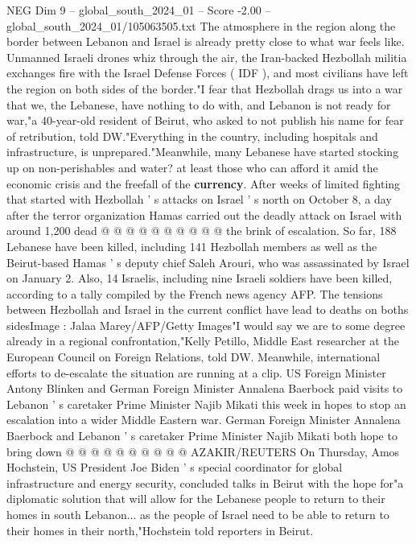 \begin{textsample}{NEG Dim 9 – global\_south\_2024\_01 – Score -2.00 – global\_south\_2024\_01/105063505.txt}  \label{ex:f9_neg_387}
The atmosphere in the region along the border between Lebanon and Israel is already pretty close to what war feels like.
Unmanned Israeli drones whiz through the air, the Iran-backed Hezbollah militia exchanges fire with the Israel Defense Forces ( IDF ), and most civilians have left the region on both sides of the border."I fear that Hezbollah drags us into a war that we, the Lebanese, have nothing to do with, and Lebanon is not ready for war,"a 40-year-old resident of Beirut, who asked to not publish his name for fear of retribution, told DW."Everything in the country, including hospitals and infrastructure, is unprepared."Meanwhile, many Lebanese have started stocking up on non-perishables and water? at least those who can afford it amid the economic crisis and the freefall of the \textbf{currency}.
After weeks of limited fighting that started with Hezbollah ' s attacks on Israel ' s north on October 8, a day after the terror organization Hamas carried out the deadly attack on Israel with around 1,200 dead @ @ @ @ @ @ @ @ @ @ the brink of escalation.
So far, 188 Lebanese have been killed, including 141 Hezbollah members as well as the Beirut-based Hamas ' s deputy chief Saleh Arouri, who was assassinated by Israel on January 2.
Also, 14 Israelis, including nine Israeli soldiers have been killed, according to a tally compiled by the French news agency AFP.
The tensions between Hezbollah and Israel in the current conflict have lead to deaths on boths sidesImage : Jalaa Marey/AFP/Getty Images"I would say we are to some degree already in a regional confrontation,"Kelly Petillo, Middle East researcher at the European Council on Foreign Relations, told DW.
Meanwhile, international efforts to de-escalate the situation are running at a clip.
US Foreign Minister Antony Blinken and German Foreign Minister Annalena Baerbock paid visits to Lebanon ' s caretaker Prime Minister Najib Mikati this week in hopes to stop an escalation into a wider Middle Eastern war.
German Foreign Minister Annalena Baerbock and Lebanon ' s caretaker Prime Minister Najib Mikati both hope to bring down @ @ @ @ @ @ @ @ @ @ AZAKIR/REUTERS On Thursday, Amos Hochstein, US President Joe Biden ' s special coordinator for global infrastructure and energy security, concluded talks in Beirut with the hope for"a diplomatic solution that will allow for the Lebanese people to return to their homes in south Lebanon... as the people of Israel need to be able to return to their homes in their north,"Hochstein told reporters in Beirut.

\end{textsample}
